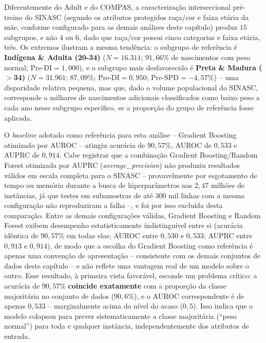 Diferentemente do Adult e do COMPAS, a caracterização interseccional pré-treino do SINASC (segundo os atributos protegidos raça/cor e faixa etária da mãe, conforme configurado para as demais análises deste capítulo) produz $15$ subgrupos, e não $4$ ou $6$, dado que raça/cor possui cinco categorias e faixa etária, três. Os extremos ilustram a mesma tendência: o subgrupo de referência é \textbf{Indígena \& Adulta (20-34)} ($N=16.311$; $91,66\%$ de nascimentos com peso normal; $\text{Pre-DI}=1,000$), e o subgrupo mais desfavorecido é \textbf{Preta \& Madura ($>$34)} ($N=31.961$; $87,09\%$; $\text{Pre-DI}=0,950$; $\text{Pre-SPD}=-4,57\%$) -- uma disparidade relativa pequena, mas que, dado o volume populacional do SINASC, corresponde a milhares de nascimentos adicionais classificados como baixo peso a cada ano nesse subgrupo específico, se a proporção do grupo de referência fosse aplicada.

O \textit{baseline} adotado como referência para esta análise -- Gradient Boosting otimizado por AUROC -- atingiu acurácia de $90,57\%$, AUROC de $0,533$ e AUPRC de $0,914$. Cabe registrar que a combinação Gradient Boosting/Random Forest otimizada por AUPRC (\textit{average\_precision}) não produziu resultados válidos em escala completa para o SINASC -- provavelmente por esgotamento de tempo ou memória durante a busca de hiperparâmetros nas $2,47$ milhões de instâncias, já que testes em subamostras de até $300$ mil linhas com a mesma configuração não reproduziram a falha --, e foi por isso excluída desta comparação. Entre as demais configurações válidas, Gradient Boosting e Random Forest exibem desempenho estatisticamente indistinguível entre si (acurácia idêntica de $90,57\%$ em todas elas; AUROC entre $0,530$ e $0,533$; AUPRC entre $0,913$ e $0,914$), de modo que a escolha do Gradient Boosting como referência é apenas uma convenção de apresentação -- consistente com os demais conjuntos de dados deste capítulo -- e não reflete uma vantagem real de um modelo sobre o outro. Esse resultado, à primeira vista favorável, esconde um problema crítico: a acurácia de $90,57\%$ \textbf{coincide exatamente} com a proporção da classe majoritária no conjunto de dados ($90,6\%$), e o AUROC correspondente é de apenas $0,533$ -- marginalmente acima do nível do acaso ($0,5$). Isso indica que o modelo colapsou para prever sistematicamente a classe majoritária (``peso normal'') para toda e qualquer instância, independentemente dos atributos de entrada.

